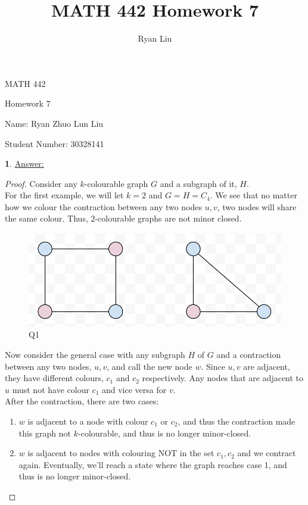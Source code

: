 \documentclass[12pt,a4paper]{article}
\author{Ryan Liu}
\title{MATH 442 Homework 7}
\theoremstyle{definition}
\newtheorem{problem}{}
\begin{document}
\begin{center}
{\huge MATH 442 \par}
{\Large Homework  7  \par}
{\normalsize Name: Ryan Zhuo Lun Liu \par}
{\normalsize Student Number: 30328141 \par}
\end{center}

\begin{problem} \underline{Answer:}
\begin{proof} 
Consider any $k$-colourable graph $G$ and a subgraph of it, $H$. \\

For the first example, we will let $k = 2$ and $G = H = C_4$. We see that no matter how we colour the contraction between any two nodes $u, v$, two nodes will share the same colour. Thus, $2$-colourable graphs are not minor closed. 

\begin{figure}[H]
    \centering
    \includegraphics[scale=0.6]{q1.png}
    \caption{Q1}
    \label{fig:my_label}
\end{figure}

Now consider the general case with any subgraph $H$ of $G$ and a contraction between any two nodes, $u, v$, and call the new node $w$. Since $u, v$ are adjacent, they have different colours, $c_1$ and $c_2$ respectively. Any nodes that are adjacent to $u$ must not have colour $c_1$ and vice versa for $v$. \\

After the contraction, there are two cases:
\begin{enumerate}
    \item $w$ is adjacent to a node with colour $c_1$ or $c_2$, and thus the contraction made this graph not $k$-colourable, and thus is no longer minor-closed.
    \item $w$ is adjacent to nodes with colouring NOT in the set $c_1, c_2$ and we contract again. Eventually, we'll reach a state where the graph reaches case 1, and thus is no longer minor-closed.
\end{enumerate}
\end{proof}
\end{problem}
\end{document}
